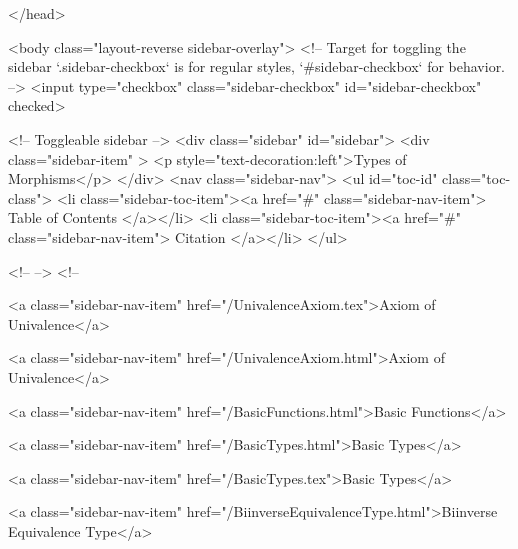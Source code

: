   
</head>




  <body class="layout-reverse sidebar-overlay">
    <!-- Target for toggling the sidebar `.sidebar-checkbox` is for regular
     styles, `#sidebar-checkbox` for behavior. -->
<input type="checkbox" class="sidebar-checkbox" id="sidebar-checkbox" checked>

<!-- Toggleable sidebar -->
<div class="sidebar" id="sidebar">
  <div class="sidebar-item" >
    <p style="text-decoration:left">Types of Morphisms</p>
  </div>
  <nav class="sidebar-nav">
    <ul id="toc-id" class="toc-class">
  <li class="sidebar-toc-item"><a href="#" class="sidebar-nav-item"> Table of Contents </a></li>
  <li class="sidebar-toc-item"><a href="#" class="sidebar-nav-item"> Citation </a></li>
</ul>


    <!--  -->
    <!-- 
      
    
      
    
      
    
      
    
      
        
      
    
      
        
          <a class="sidebar-nav-item" href="/UnivalenceAxiom.tex">Axiom of Univalence</a>
        
      
    
      
        
          <a class="sidebar-nav-item" href="/UnivalenceAxiom.html">Axiom of Univalence</a>
        
      
    
      
        
          <a class="sidebar-nav-item" href="/BasicFunctions.html">Basic Functions</a>
        
      
    
      
        
          <a class="sidebar-nav-item" href="/BasicTypes.html">Basic Types</a>
        
      
    
      
        
          <a class="sidebar-nav-item" href="/BasicTypes.tex">Basic Types</a>
        
      
    
      
        
          <a class="sidebar-nav-item" href="/BiinverseEquivalenceType.html">Biinverse Equivalence Type</a>
        
